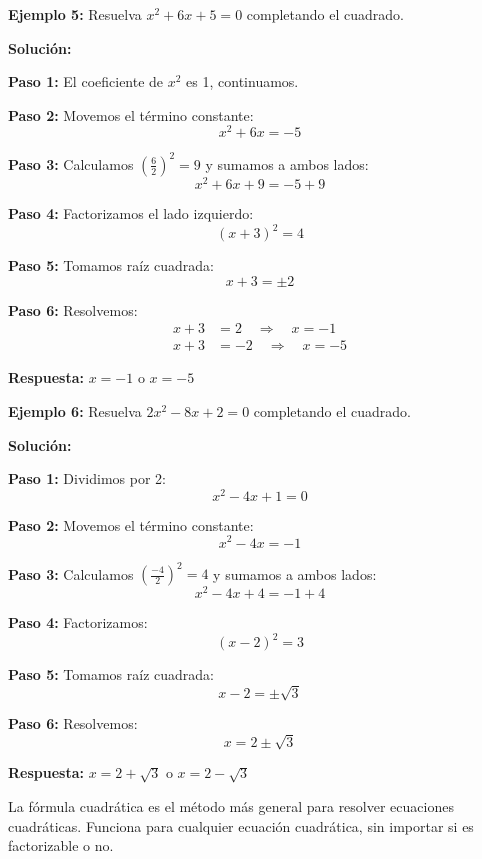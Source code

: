 \begin{example}
\textbf{Ejemplo 5:} Resuelva $x^2 + 6x + 5 = 0$ completando el cuadrado.

\textbf{Solución:}

\textbf{Paso 1:} El coeficiente de $x^2$ es 1, continuamos.

\textbf{Paso 2:} Movemos el término constante:
$$x^2 + 6x = -5$$

\textbf{Paso 3:} Calculamos $\left(\frac{6}{2}\right)^2 = 9$ y sumamos a ambos lados:
$$x^2 + 6x + 9 = -5 + 9$$

\textbf{Paso 4:} Factorizamos el lado izquierdo:
$$(x + 3)^2 = 4$$

\textbf{Paso 5:} Tomamos raíz cuadrada:
$$x + 3 = \pm 2$$

\textbf{Paso 6:} Resolvemos:
\begin{align}
x + 3 &= 2 \quad \Rightarrow \quad x = -1\\
x + 3 &= -2 \quad \Rightarrow \quad x = -5
\end{align}

\textbf{Respuesta:} $x = -1$ o $x = -5$
\end{example}

\begin{example}
\textbf{Ejemplo 6:} Resuelva $2x^2 - 8x + 2 = 0$ completando el cuadrado.

\textbf{Solución:}

\textbf{Paso 1:} Dividimos por 2:
$$x^2 - 4x + 1 = 0$$

\textbf{Paso 2:} Movemos el término constante:
$$x^2 - 4x = -1$$

\textbf{Paso 3:} Calculamos $\left(\frac{-4}{2}\right)^2 = 4$ y sumamos a ambos lados:
$$x^2 - 4x + 4 = -1 + 4$$

\textbf{Paso 4:} Factorizamos:
$$(x - 2)^2 = 3$$

\textbf{Paso 5:} Tomamos raíz cuadrada:
$$x - 2 = \pm\sqrt{3}$$

\textbf{Paso 6:} Resolvemos:
$$x = 2 \pm \sqrt{3}$$

\textbf{Respuesta:} $x = 2 + \sqrt{3}$ o $x = 2 - \sqrt{3}$
\end{example}


La fórmula cuadrática es el método más general para resolver ecuaciones cuadráticas. Funciona para cualquier ecuación cuadrática, sin importar si es factorizable o no.

